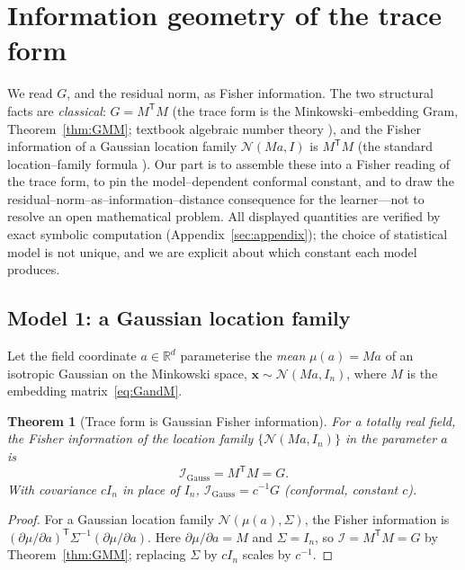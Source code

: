 \documentclass[11pt]{article}
\theoremstyle{plain}
\newtheorem{theorem}{Theorem}[section]
\theoremstyle{definition}
\theoremstyle{remark}
\newcommand{\R}{\mathbb{R}}
\newcommand{\Fish}{\mathcal{I}}
\newcommand{\xx}{\mathbf{x}}
\newcommand{\GG}{G}
\newcommand{\transpose}{^{\mathsf{T}}}
\newcommand{\inv}{^{-1}}
\begin{document}
\section{Information geometry of the trace form}\label{sec:infogeo}

We read $\GG$, and the residual norm, as Fisher information. The two structural facts are \emph{classical}:
$\GG=M\transpose M$ (the trace form is the Minkowski--embedding Gram, Theorem~\ref{thm:GMM}; textbook
algebraic number theory \cite{Neukirch,Marcus}), and the Fisher information of a Gaussian location family
$\mathcal N(Ma,I)$ is $M\transpose M$ (the standard location--family formula \cite{Amari}). Our part is to
assemble these into a Fisher reading of the trace form, to pin the model--dependent conformal constant, and
to draw the residual--norm--as--information--distance consequence for the learner---not to resolve an open
mathematical problem. All displayed quantities are verified by exact symbolic computation
(Appendix~\ref{sec:appendix}); the choice of statistical model is not unique, and we are explicit about which
constant each model produces.

\subsection{Model 1: a Gaussian location family}
Let the field coordinate $a\in\R^d$ parameterise the \emph{mean} $\mu(a)=Ma$ of an isotropic Gaussian on the
Minkowski space, $\xx\sim\mathcal N(Ma,I_n)$, where $M$ is the embedding matrix~\eqref{eq:GandM}.

\begin{theorem}[Trace form is Gaussian Fisher information]\label{thm:gaussfisher}
For a totally real field, the Fisher information of the location family $\{\mathcal N(Ma,I_n)\}$ in the
parameter $a$ is
\[
  \Fish_{\mathrm{Gauss}}=M\transpose M=\GG .
\]
With covariance $cI_n$ in place of $I_n$, $\Fish_{\mathrm{Gauss}}=c\inv\GG$ (conformal, constant $c$).
\end{theorem}
\begin{proof}
For a Gaussian location family $\mathcal N(\mu(a),\Sigma)$, the Fisher information is
$(\partial\mu/\partial a)\transpose\Sigma\inv(\partial\mu/\partial a)$. Here $\partial\mu/\partial a=M$ and
$\Sigma=I_n$, so $\Fish=M\transpose M=\GG$ by Theorem~\ref{thm:GMM}; replacing $\Sigma$ by $cI_n$ scales by
$c\inv$.
\end{proof}
\end{document}
